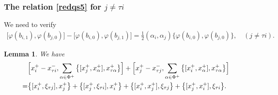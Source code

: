 \documentclass[11pt,reqno]{amsart}
\numberwithin{equation}{section}
\newtheorem{lem}[thm]{Lemma}
\theoremstyle{definition}
\theoremstyle{remark}
\begin{document}
\subsubsection{The relation \eqref{redqs5} for $j\ne\tau i$}
We need to verify
\begin{align}
\big[\varphi(b_{i,1}),\varphi(b_{j,0})\big]-\big[\varphi(b_{i,0}),\varphi(b_{j,1})\big]= \tfrac12(\alpha_i,\alpha_j)\big\{\varphi(b_{i,0}),\varphi(b_{j,0})\big\},	\quad (j\ne \tau i).\label{bbinej}
\end{align}
\begin{lem}\label{lem:helper2}
We have
\begin{align}
&\Big[x_i^+-x_{\tau i}^-,\sum_{\alpha\in\Phi^+}\big\{[x_j^+,x_\alpha^+],x_{\tau\alpha}^+\big\}\Big]+\Big[x_j^+-x_{\tau j}^-,\sum_{\alpha\in\Phi^+}\big\{[x_i^+,x_\alpha^+],x_{\tau\alpha}^+\big\}\Big]\label{helper2}\\
=&\big\{[x_i^+,\xi_{\tau j}],x_j^+\big\}+\big\{[x_j^+,\xi_{\tau i}],x_i^+\big\}+\big\{[x_i^+,x_j^+],\xi_{\tau j}\big\}+\big\{[x_j^+,x_i^+],\xi_{\tau i}\big\}.\notag
\end{align}
\end{lem}
\end{document}
